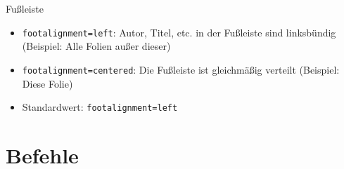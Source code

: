\documentclass[german,10pt,compress]{beamer}
\begin{document}
\def\rptufootalignment{centered}%
\begin{frame}{Fußleiste}
	\begin{itemize}
		\item \lstinline|footalignment=left|: Autor, Titel, etc. in der Fußleiste sind linksbündig (Beispiel: Alle Folien außer dieser)
		\item \lstinline|footalignment=centered|: Die Fußleiste ist gleichmäßig verteilt (Beispiel: Diese Folie)
		\item Standardwert: \lstinline|footalignment=left|
	\end{itemize}
\end{frame}
\def\rptufootalignment{left}%
\section{Befehle}
\end{document}
